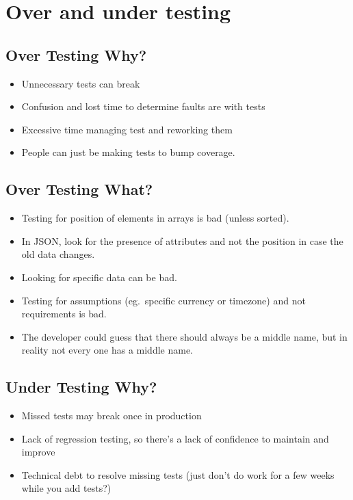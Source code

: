 \section{Over and under testing}\label{sec:over_and_under_testing}

\subsection{Over Testing Why?}\label{sub:over_testing_why_}

\begin{itemize}
    \item Unnecessary tests can break
    \item Confusion and lost time to determine faults are with tests
    \item Excessive time managing test and reworking them
    \item People can just be making tests to bump coverage.
\end{itemize}

\subsection{Over Testing What?}\label{sub:over_testing_what_}

\begin{itemize}
    \item Testing for position of elements in arrays is bad (unless sorted).
    \item In JSON, look for the presence of attributes and not the position in case the old data changes.
    \item Looking for specific data can be bad.
    \item Testing for assumptions (eg.\ specific currency or timezone) and not requirements is bad.
    \item The developer could guess that there should always be a middle name, but in reality not every one has a middle name.
\end{itemize}

\subsection{Under Testing Why?}\label{sub:under_testing_why_}

\begin{itemize}
    \item Missed tests may break once in production
    \item Lack of regression testing, so there's a lack of confidence to maintain and improve
    \item Technical debt to resolve missing tests (just don't do work for a few weeks while you add tests?)
\end{itemize}

